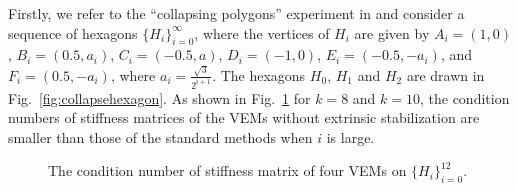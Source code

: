 \documentclass[10pt]{amsart}
\numberwithin{equation}{section}
\begin{document}
Firstly, we refer to the ``collapsing polygons'' experiment in
\cite{Mascotto2018} and consider a sequence of hexagons
$\{H_i\}_{i=0}^{\infty}$, where the vertices of $H_i$ are given by
$A_i = (1, 0)$, $B_i = (0.5, a_i)$, $C_i = (-0.5, a)$, $D_i=(-1, 0)$, 
$E_i = (-0.5, -a_i)$, and $F_i = (0.5, -a_i)$,
where $a_i = \frac{\sqrt{3}}{2^{i+1}}$. The hexagons $H_0$, $H_1$ and $H_2$ are drawn
in Fig.~\ref{fig:collapsehexagon}. 
As shown in Fig.~\ref{fig:collapsehexagon_conditionnumber} for $k=8$ and $k=10$, the condition numbers of stiffness
matrices of the VEMs without extrinsic stabilization are smaller than those of the standard methods when $i$ is large.
\begin{figure}[htbp]
\quad \quad
{}
\caption{The condition number of stiffness matrix of four VEMs on
$\{H_i\}_{i=0}^{12}$.}
\label{fig:collapsehexagon_conditionnumber}
\end{figure}

\end{document}
